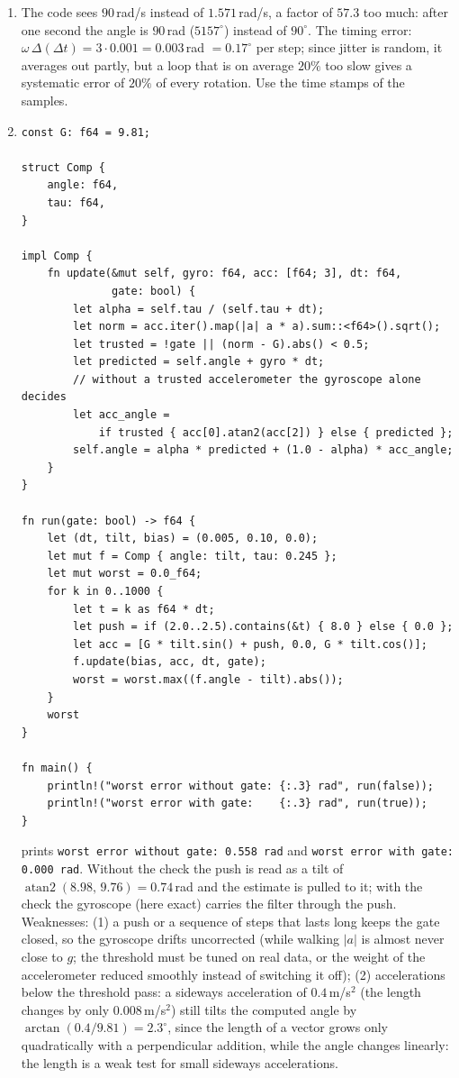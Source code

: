 \begin{enumerate}[label=\textbf{\ansnum.\arabic*}]
  \item The code sees $90$\,rad/s instead of $1.571$\,rad/s, a factor of $57.3$ too much: after one second the angle is $90$\,rad ($5157^{\circ}$) instead of $90^{\circ}$. The timing error: $\omega\,\Delta(\Delta t)=3\cdot0.001=0.003$\,rad $=0.17^{\circ}$ per step; since jitter is random, it averages out partly, but a loop that is on average $20\%$ too slow gives a systematic error of $20\%$ of every rotation. Use the time stamps of the samples.
  \item
\begin{verbatim}
const G: f64 = 9.81;

struct Comp {
    angle: f64,
    tau: f64,
}

impl Comp {
    fn update(&mut self, gyro: f64, acc: [f64; 3], dt: f64,
              gate: bool) {
        let alpha = self.tau / (self.tau + dt);
        let norm = acc.iter().map(|a| a * a).sum::<f64>().sqrt();
        let trusted = !gate || (norm - G).abs() < 0.5;
        let predicted = self.angle + gyro * dt;
        // without a trusted accelerometer the gyroscope alone decides
        let acc_angle =
            if trusted { acc[0].atan2(acc[2]) } else { predicted };
        self.angle = alpha * predicted + (1.0 - alpha) * acc_angle;
    }
}

fn run(gate: bool) -> f64 {
    let (dt, tilt, bias) = (0.005, 0.10, 0.0);
    let mut f = Comp { angle: tilt, tau: 0.245 };
    let mut worst = 0.0_f64;
    for k in 0..1000 {
        let t = k as f64 * dt;
        let push = if (2.0..2.5).contains(&t) { 8.0 } else { 0.0 };
        let acc = [G * tilt.sin() + push, 0.0, G * tilt.cos()];
        f.update(bias, acc, dt, gate);
        worst = worst.max((f.angle - tilt).abs());
    }
    worst
}

fn main() {
    println!("worst error without gate: {:.3} rad", run(false));
    println!("worst error with gate:    {:.3} rad", run(true));
}
\end{verbatim}
prints \verb!worst error without gate: 0.558 rad! and \verb!worst error with gate: 0.000 rad!. Without the check the push is read as a tilt of $\operatorname{atan2}(8.98,\,9.76)=0.74$\,rad and the estimate is pulled to it; with the check the gyroscope (here exact) carries the filter through the push. Weaknesses: (1) a push or a sequence of steps that lasts long keeps the gate closed, so the gyroscope drifts uncorrected (while walking $|a|$ is almost never close to $g$; the threshold must be tuned on real data, or the weight of the accelerometer reduced smoothly instead of switching it off); (2) accelerations below the threshold pass: a sideways acceleration of $0.4$\,m/s$^2$ (the length changes by only $0.008$\,m/s$^2$) still tilts the computed angle by $\arctan(0.4/9.81)=2.3^{\circ}$, since the length of a vector grows only quadratically with a perpendicular addition, while the angle changes linearly: the length is a weak test for small sideways accelerations.
\end{enumerate}
